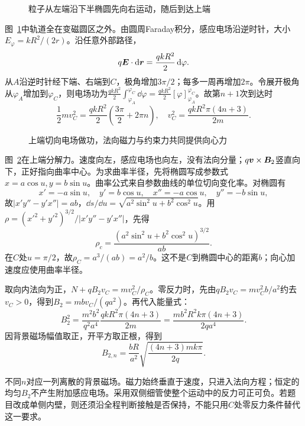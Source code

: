 \begin{figure}[H]\centering
{}
\caption{粒子从左端沿下半椭圆先向右运动，随后到达上端}\label{fig:i4-e11-q}
\end{figure}
\begin{solution}
图~\ref{fig:i4-e11-q}中轨道全在变磁圆区之外。由圆周Faraday积分，感应电场沿逆时针，大小$E_\varphi=kR^2/(2r)$。沿任意外部路径，
\[
q\bm{E}\cdot\mathop{}\!\mathrm d\bm{r}=\frac{qkR^2}{2}\mathop{}\!\mathrm d\varphi.
\]
从$A$沿逆时针经下端、右端到$C$，极角增加$3\pi/2$；每多一周再增加$2\pi$。令展开极角从$\varphi_A$增加到$\varphi_C$，则电场功为$\frac{qkR^2}{2}\int_{\varphi_A}^{\varphi_C}\dd\varphi=\frac{qkR^2}{2}[\varphi]_{\varphi_A}^{\varphi_C}$。故第$n+1$次到达时
\[
\frac12mv_C^2=\frac{qkR^2}{2}\left(\frac{3\pi}{2}+2\pi n\right),\quad
v_C^2=\frac{qkR^2\pi(4n+3)}{2m}.
\]

\begin{figure}[H]\centering
{}
\caption{上端切向电场做功，法向磁力与约束力共同提供向心力}\label{fig:i4-e11-s}
\end{figure}

图~\ref{fig:i4-e11-s}在上端分解力。速度向左，感应电场也向左，没有法向分量；$q\bm{v}\times\bm{B}_2$竖直向下，正好指向曲率中心。为求曲率半径，先将椭圆写成参数式$x=a\cos u,y=b\sin u$。曲率公式来自参数曲线的单位切向变化率。对椭圆有
\[
x'=-a\sin u,\quad y'=b\cos u,\quad
x''=-a\cos u,\quad y''=-b\sin u,
\]
故$|x'y''-y'x''|=ab$，$\dd s/\dd u=\sqrt{a^2\sin^2u+b^2\cos^2u}$。用
$\rho=(x'^2+y'^2)^{3/2}/|x'y''-y'x''|$，先得
\[
\rho_c=\frac{(a^2\sin^2u+b^2\cos^2u)^{3/2}}{ab}.
\]
在$C$处$u=\pi/2$，故$\rho_C=a^3/(ab)=a^2/b$。这不是$C$到椭圆中心的距离$b$；向心加速度应使用曲率半径。

取向内法向为正，$N+qB_2v_C=mv_C^2/\rho_C$。零反力时，先由$qB_2v_C=mv_C^2b/a^2$约去$v_C>0$，得到$B_2=mbv_C/(qa^2)$。再代入能量式：
\[
B_2^2=\frac{m^2b^2}{q^2a^4}
\frac{qkR^2\pi(4n+3)}{2m}
=\frac{mb^2R^2k\pi(4n+3)}{2qa^4}.
\]
因背景磁场幅值取正，开平方取正根，得到
\[
\boxed{B_{2,n}=\frac{bR}{a^2}
\sqrt{\frac{(4n+3)mk\pi}{2q}}}.
\]

不同$n$对应一列离散的背景磁场。磁力始终垂直于速度，只进入法向方程；恒定的均匀$B_2$不产生附加感应电场。采用双侧细管使整个运动中的反力可正可负。若题目改成单侧内壁，则还须沿全程判断接触是否保持，不能只用$C$处零反力条件替代这一要求。
\end{solution}


